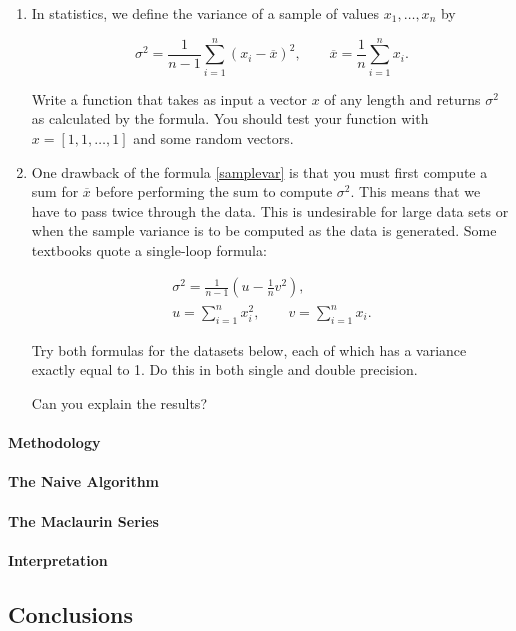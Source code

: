 \begin{exercise}
     \begin{enumerate}
        \item In statistics, we define the variance of a sample of values $x_1,\ldots,x_n$ by
    
        $$
            \label{samplevar}
            \sigma^2 = \frac{1}{n-1} \sum_{i=1}^n (x_i - \overline{x})^2,
            \qquad 
            \overline{x} = \frac{1}{n} \sum_{i=1}^n x_i.
        $$ 

        Write a function that takes as input a vector $x$ of any length and returns $\sigma^2$ as calculated by the formula. You should test your function with $x=[1,1,\ldots,1]$ and some random vectors. 

        \item One drawback of the formula \eqref{samplevar} is that you must first compute a sum for $\overline{x}$ before performing the sum to compute $\sigma^2$. This means that we have to pass twice through the data. This is undesirable for large data sets or when the sample variance is to be computed as the data is generated. Some textbooks quote a single-loop formula:
  
        $$ 
            \begin{align*}
                \sigma^2 = \frac{1}{n-1} \left( u - \tfrac{1}{n}v^2 \right),\\
                u  = \sum_{i=1}^n x_i^2, 
                \qquad
                v = \sum_{i=1}^n x_i.
            \end{align*}
        $$

        Try both formulas for the datasets below, each of which has a variance exactly equal to 1. Do this in both single and double precision.
    
        Can you explain the results?

     \end{enumerate}

\end{exercise}

\begin{exercise}
    \paragraph{Methodology}
    \paragraph{The Naive Algorithm}
    \paragraph{The Maclaurin Series}
    \paragraph{Interpretation}
\end{exercise}



\subsection{Conclusions}